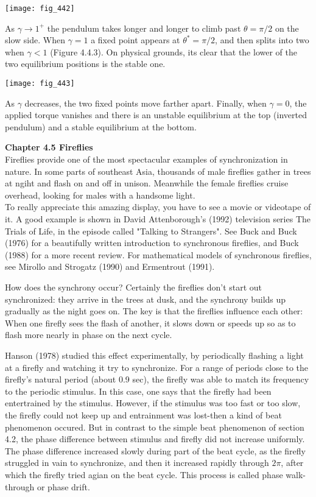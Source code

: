 \documentclass{article}
\newcommand\tab[1][1cm]{\hspace*{#1}}
\begin{document}
\texttt{[image: fig\_442]}

As $\gamma \to 1^{+}$ the pendulum takes longer and longer to climb past $\theta=\pi/2$ on the slow side. When $\gamma=1$ a fixed point appears at $\theta^{*}=\pi/2$, and then splits into two when $\gamma<1$ (Figure 4.4.3). On physical grounds, its clear that the lower of the two equilibrium positions is the stable one.

\texttt{[image: fig\_443]}

As $\gamma$ decreases, the two fixed points move farther apart. Finally, when $\gamma=0$, the applied torque vanishes and there is an unstable equilibrium at the top (inverted pendulum) and a stable equilibrium at the bottom.

\textbf {Chapter 4.5 Fireflies}
\\ Fireflies provide one of the most spectacular examples of synchronization in nature. In some parts of southeast Asia, thousands of male fireflies gather in trees at ngiht and flash on and off in unison. Meanwhile the female fireflies cruise overhead, looking for males with a handsome light. \\ \tab
To really appreciate this amazing display, you have to see a movie or videotape of it. A good example is shown in David Attenborough's (1992) television series The Trials of Life, in the episode called "Talking to Strangers". See Buck and Buck (1976) for a beautifully written introduction to synchronous fireflies, and Buck (1988) for a more recent review. For mathematical models of synchronous fireflies, see Mirollo and Strogatz (1990) and Ermentrout (1991). \\ \tab

How does the synchrony occur? Certainly the fireflies don't start out synchronized: they arrive in the trees at dusk, and the synchrony builds up gradually as the night goes on. The key is that the fireflies influence each other: When one firefly sees the flash of another, it slows down or speeds up so as to flash more nearly in phase on the next cycle. \\ \tab

Hanson (1978) studied this effect experimentally, by periodically flashing a light at a firefly and watching it try to synchronize. For a range of periods close to the firefly's natural period (about 0.9 sec), the firefly was able to match its frequency to the periodic stimulus. In this case, one says that the firefly had been entertrained by the stimulus. However, if the stimulus was too fast or too slow, the firefly could not keep up and entrainment was lost-then a kind of beat phenomenon occured. But in contrast to the simple beat phenomenon of section 4.2, the phase difference between stimulus and firefly did not increase uniformly. The phase difference increased slowly during part of the beat cycle, as the firefly struggled in vain to synchronize, and then it increased rapidly through $2\pi$, after which the firefly tried agian on the beat cycle. This process is called phase walk-through or phase drift.
\end{document}
